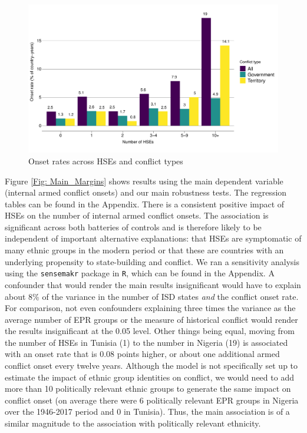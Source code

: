 \begin{figure}[htb]
	\includegraphics[width=\textwidth]{img/hse_onset_rates.pdf}
	\caption{Onset rates across HSEs and conflict types} 
	\label{Fig: Onset_rates}
\end{figure}

Figure \ref{Fig: Main_Margins} shows results using the main dependent variable
(internal armed conflict onsets) and our main robustness tests. The regression
tables can be found in the Appendix. There is a consistent positive impact of
HSEs on the number of internal armed conflict onsets. The association is
significant across both batteries of controls and is therefore likely to be
independent of important alternative explanations: that HSEs are symptomatic of
many ethnic groups in the modern period or that these are countries with an
underlying propensity to state-building and conflict. We ran a sensitivity
analysis using the \texttt{sensemakr} package in \texttt{R}, which can be found
in the Appendix. A confounder that would render the main results insignificant
would have to explain about 8\% of the variance in the number of ISD states
\textit{and} the conflict onset rate. For comparison, not even confounders
explaining three times the variance as the average number of EPR groups or the
measure of historical conflict would render the results insignificant at the
0.05 level.  Other things being equal, moving from the number of HSEs in Tunisia
(1) to the number in Nigeria (19) is associated with an onset rate that is 0.08
points higher, or about one additional armed conflict onset every twelve years.
Although the model is not specifically set up to estimate the impact of ethnic
group identities on conflict, we would need to add more than 10 politically
relevant ethnic groups to generate the same impact on conflict onset (on average
there were 6 politically relevant EPR groups in Nigeria over the 1946-2017
period and 0 in Tunisia). Thus, the main association is of a similar magnitude
to the association with politically relevant ethnicity. 

